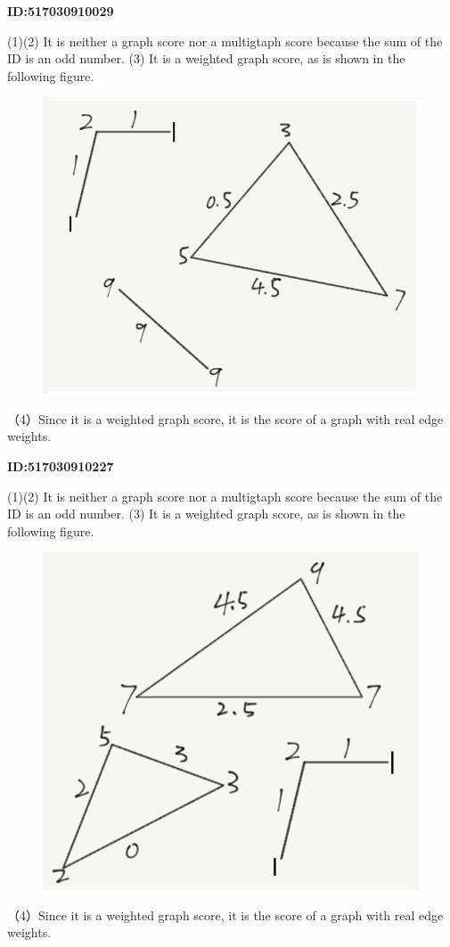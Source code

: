 \documentclass{article} %
\begin{document}
	\textbf{ID:517030910029}\par
	(1)(2) It is neither a graph score nor a multigtaph score because the sum of the ID is an odd number.
	(3) It is a weighted graph score, as is shown in the following figure.
	
	\begin{figure}[H]
		\centering
		\includegraphics[scale=0.6]{10029.png}
		\caption{}
		\label{fig:3}
	\end{figure}
	（4）Since it is a weighted graph score, it is the score of a graph with real edge weights.

	\textbf{ID:517030910227}\par
	(1)(2) It is neither a graph score nor a multigtaph score because the sum of the ID is an odd number.
	(3) It is a weighted graph score, as is shown in the following figure.
	
	\begin{figure}[H]
		\centering
		\includegraphics[scale=0.6]{10227.png}
		\caption{}
		\label{fig:4}
	\end{figure}
	（4）Since it is a weighted graph score, it is the score of a graph with real edge weights.
\end{document}
